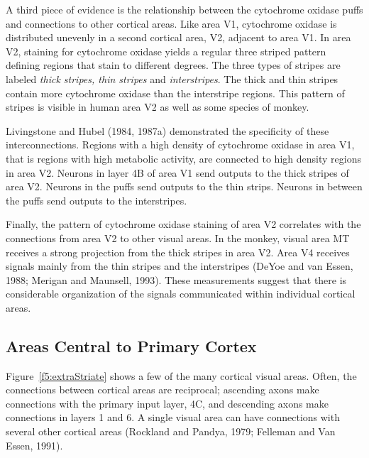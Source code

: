 A third piece of evidence is the relationship between
the cytochrome oxidase puffs and connections
to other cortical areas.
Like area V1, cytochrome oxidase is distributed
unevenly in a second cortical area, V2, 
adjacent to area V1.
In area V2, staining for cytochrome oxidase yields
a regular three striped pattern defining
regions that stain to different degrees.
The three types of stripes are
labeled {\em thick stripes, thin stripes} and {\em interstripes}.
The thick and thin stripes contain more
cytochrome oxidase than the interstripe regions.
This pattern of stripes is visible
in human area V2 as well as some species of monkey.

Livingstone and Hubel (1984, 1987a) demonstrated the
specificity of these interconnections.
Regions with a high density of cytochrome oxidase in area V1,
that is regions with high metabolic activity,
are connected to high density regions in area V2.
Neurons in layer 4B of area V1 send outputs to the thick stripes of
area V2.
Neurons in the puffs send outputs to the thin strips.
Neurons in between the puffs send outputs to the interstripes.

Finally, the pattern of cytochrome oxidase staining of area V2
correlates with the connections from area V2 to other
visual areas.
In the monkey, visual area MT receives a strong
projection from the thick stripes in area V2.
Area V4 receives signals mainly from the thin stripes
and the interstripes (DeYoe and van Essen, 1988;
Merigan and Maunsell, 1993).
These measurements suggest that there is considerable
organization of the signals communicated
within individual cortical areas.

\subsection*{Areas Central to Primary Cortex}
Figure~\ref{f5:extraStriate} shows a few of the
many cortical visual areas.
Often, the connections between cortical areas are reciprocal;
ascending axons  make connections with the primary input layer, 4C,
and descending axons make connections in layers 1 and 6.
A single visual area can have connections with several
other cortical areas (Rockland and Pandya, 1979;
Felleman and Van Essen, 1991).

